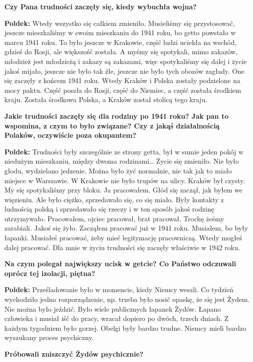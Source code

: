 \begin{otherlanguage}{polish}
\textbf{Czy Pana trudności zaczęły się, kiedy wybuchła wojna?}

\textbf{Poldek:} Wtedy wszystko się całkiem zmieniło. Musieliśmy się przystosować, jeszcze mieszkaliśmy w swoim mieszkaniu do 1941 roku, bo getto powstało w marcu 1941 roku. To było jeszcze w Krakowie, część ludzi uciekła na wschód, gdzieś do Rosji, ale większość została. A myśmy się spotykali, mimo zakazów, młodzież jest młodzieżą i zakazy są zakazami, więc spotykaliśmy się dalej i życie jakoś mijało, jeszcze nie było tak źle, jeszcze nie było tych obozów zagłady. One się zaczęły z końcem 1941 roku. Wtedy Kraków i Polska zostały podzielone na mocy paktu. Część poszła do Rosji, część do Niemiec, a część została środkiem kraju. Została środkowa Polska, a Kraków został stolicą tego kraju. 

\textbf{Jakie trudności zaczęły się dla rodziny po 1941 roku? Jak pan to wspomina, z czym to było związane? Czy z jakąś działalnością Polaków, oczywiście poza okupantem?}

\textbf{Poldek:} Trudności były szczególnie ze strony getta, był w sumie jeden pokój w niedużym mieszkaniu, między dwoma rodzinami… Życie się zmieniło. Nie było głodu, wydzielano jedzenie. Można było żyć normalnie, nie tak jak to miało miejsce w Warszawie. W Krakowie nie było trupów na ulicy. Kraków był czysty. My się spotykaliśmy przy bloku. Ja pracowałem. Głód się zaczął, jak byłem we więzieniu. Ale było ciężko, sprzedawało się, co się miało. Były kontakty z ludnością polską i sprzedawało się rzeczy i w ten sposób jakoś rodzinę utrzymywało. Pracowałem, ojciec pracował, brat pracował. Trochę żeśmy zarabiali. Jakoś się żyło. Zacząłem pracować już w 1941 roku. Musiałem, bo były łapanki. Musiałeś pracować, żeby mieć legitymację pracowniczą. Wtedy mogłeś dalej pracować. Dla mnie w życiu trudności się zaczęły właściwie w 1942 roku.
 
\textbf{Na czym polegał największy ucisk w getcie? Co Państwo odczuwali oprócz tej izolacji, piętna?}

\textbf{Poldek:} Prześladowanie było w momencie, kiedy Niemcy weszli. Co tydzień wychodziło jedno rozporządzenie, np. trzeba było nosić opaskę, że się jest Żydem. Nie można było jeździć. Było wiele publicznych łapanek Żydów. Łapano człowieka i musiał iść do pracy, wracał dopiero po dwóch, trzech dniach. Z każdym tygodniem było gorzej. Obelgi były bardzo trudne. Niemcy mieli bardzo wyszukany proces psychiczny.

\textbf{Próbowali zniszczyć Żydów psychicznie?}


\end{otherlanguage}
